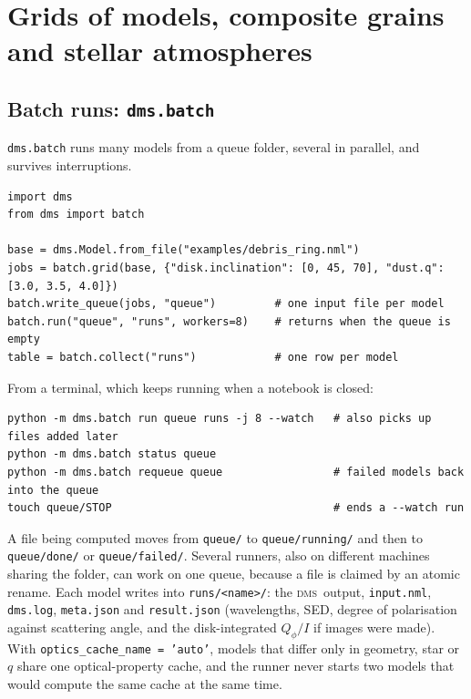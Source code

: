 \documentclass[11pt,a4paper]{article}
\newcommand{\dms}{\textsc{dms}}
\newcommand{\code}[1]{\texttt{#1}}
\begin{document}
\section{Grids of models, composite grains and stellar atmospheres}
\label{sec:tools}

\subsection{Batch runs: \code{dms.batch}}

\code{dms.batch} runs many models from a queue folder, several in parallel, and survives
interruptions.

\begin{lstlisting}[style=py]
import dms
from dms import batch

base = dms.Model.from_file("examples/debris_ring.nml")
jobs = batch.grid(base, {"disk.inclination": [0, 45, 70], "dust.q": [3.0, 3.5, 4.0]})
batch.write_queue(jobs, "queue")         # one input file per model
batch.run("queue", "runs", workers=8)    # returns when the queue is empty
table = batch.collect("runs")            # one row per model
\end{lstlisting}

From a terminal, which keeps running when a notebook is closed:

\begin{lstlisting}[style=sh]
python -m dms.batch run queue runs -j 8 --watch   # also picks up files added later
python -m dms.batch status queue
python -m dms.batch requeue queue                 # failed models back into the queue
touch queue/STOP                                  # ends a --watch run
\end{lstlisting}

A file being computed moves from \code{queue/} to \code{queue/running/} and then to
\code{queue/done/} or \code{queue/failed/}. Several runners, also on different machines sharing
the folder, can work on one queue, because a file is claimed by an atomic rename. Each model writes
into \code{runs/<name>/}: the \dms\ output, \code{input.nml}, \code{dms.log}, \code{meta.json} and
\code{result.json} (wavelengths, SED, degree of polarisation against scattering angle, and the
disk-integrated $Q_\phi/I$ if images were made). With \code{optics\_cache\_name = 'auto'}, models
that differ only in geometry, star or $q$ share one optical-property cache, and the runner never
starts two models that would compute the same cache at the same time.
\end{document}
